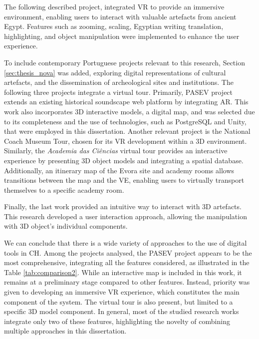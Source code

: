 The following described project, integrated \gls{VR} to provide an immersive environment, enabling users to interact with valuable artefacts from ancient Egypt. Features such as zooming, scaling, Egyptian writing translation, highlighting, and object manipulation were implemented to enhance the user experience.

To include contemporary Portuguese projects relevant to this research, Section \ref{sec:thesis_nova} was added, exploring digital representations of cultural artefacts, and the dissemination of archeological sites and institutions.
The following three projects integrate a virtual tour. Primarily, \gls{PASEV} project extends an existing historical soundscape web platform by integrating \gls{AR}. This work also incorporates 3D interactive models, a digital map, and was selected due to its completeness and the use of technologies, such as PostgreSQL and Unity, that were employed in this dissertation. 
Another relevant project is the National Coach Museum Tour, chosen for its \gls{VR} development within a 3D environment.
Similarly, the \textit{Academia das Ciências} virtual tour provides an interactive experience by presenting \gls{3D} object models and integrating a spatial database. Additionally, an itinerary map of the Evora site and academy rooms allows transitions between the map and the \gls{VE}, enabling users to virtually transport themselves to a specific academy room.

Finally, the last work provided an intuitive way to interact with \gls{3D} artefacts. This research developed a user interaction approach, allowing the manipulation with \gls{3D} object's individual components.

We can conclude that there is a wide variety of approaches to the use of digital tools in \gls{CH}. Among the projects analysed, the PASEV project appears to be the most comprehensive, integrating all the features considered, as illustrated in the Table \ref{tab:comparison2}.
While an interactive map is included in this work, it remains at a preliminary stage compared to other features. 
Instead, priority was given to developing an immersive \gls{VR} experience, which constitutes the main component of the system. The virtual tour is also present, but limited to a specific \gls{3D} model component. 
In general, most of the studied research works integrate only two of these features, highlighting the novelty of combining multiple approaches in this dissertation.

\newcommand{\cmark}{\ding{51}} %
\newcommand{\xmark}{\ding{55}} %


